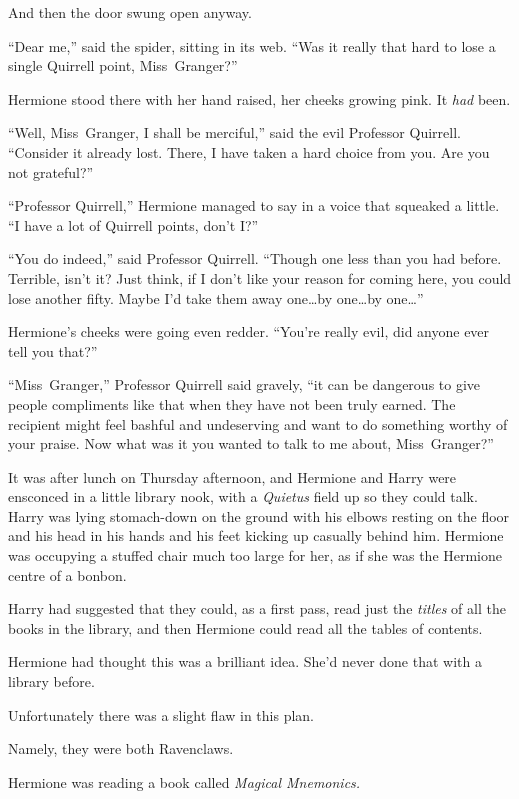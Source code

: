 And then the door swung open anyway.

“Dear me,” said the spider, sitting in its web. “Was it really that hard to lose a single Quirrell point, Miss~Granger?”

Hermione stood there with her hand raised, her cheeks growing pink. It \emph{had} been.

“Well, Miss~Granger, I shall be merciful,” said the evil Professor Quirrell. “Consider it already lost. There, I have taken a hard choice from you. Are you not grateful?”

“Professor Quirrell,” Hermione managed to say in a voice that squeaked a little. “I have a lot of Quirrell points, don’t I?”

“You do indeed,” said Professor Quirrell. “Though one less than you had before. Terrible, isn’t it? Just think, if I don’t like your reason for coming here, you could lose another fifty. Maybe I’d take them away one…by one…by one…”

Hermione’s cheeks were going even redder. “You’re really evil, did anyone ever tell you that?”

“Miss~Granger,” Professor Quirrell said gravely, “it can be dangerous to give people compliments like that when they have not been truly earned. The recipient might feel bashful and undeserving and want to do something worthy of your praise. Now what was it you wanted to talk to me about, Miss~Granger?”

\later

It was after lunch on Thursday afternoon, and Hermione and Harry were ensconced in a little library nook, with a \emph{Quietus} field up so they could talk. Harry was lying stomach-down on the ground with his elbows resting on the floor and his head in his hands and his feet kicking up casually behind him. Hermione was occupying a stuffed chair much too large for her, as if she was the Hermione centre of a bonbon.

Harry had suggested that they could, as a first pass, read just the \emph{titles} of all the books in the library, and then Hermione could read all the tables of contents.

Hermione had thought this was a brilliant idea. She’d never done that with a library before.

Unfortunately there was a slight flaw in this plan.

Namely, they were both Ravenclaws.

Hermione was reading a book called \emph{Magical Mnemonics.}

